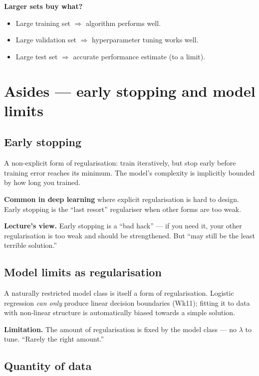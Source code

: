\documentclass[11pt, a4paper]{article}
\begin{document}
\textbf{Larger sets buy what?}
\begin{itemize}
  \item Large training set $\Rightarrow$ algorithm performs well.
  \item Large validation set $\Rightarrow$ hyperparameter tuning works well.
  \item Large test set $\Rightarrow$ accurate performance estimate (to a limit).
\end{itemize}

\section{Asides — early stopping and model limits}

\subsection{Early stopping}

A non-explicit form of regularisation: train iteratively, but stop early before training error reaches its minimum. The model's complexity is implicitly bounded by how long you trained.

\textbf{Common in deep learning} where explicit regularisation is hard to design. Early stopping is the ``last resort'' regulariser when other forms are too weak.

\textbf{Lecture's view.} Early stopping is a ``bad hack'' — if you need it, your other regularisation is too weak and should be strengthened. But ``may still be the least terrible solution.''

\subsection{Model limits as regularisation}

A naturally restricted model class is itself a form of regularisation. Logistic regression \emph{can only} produce linear decision boundaries (Wk11); fitting it to data with non-linear structure is automatically biased towards a simple solution.

\textbf{Limitation.} The amount of regularisation is fixed by the model class — no $\lambda$ to tune. ``Rarely the right amount.''

\subsection{Quantity of data}
\end{document}
